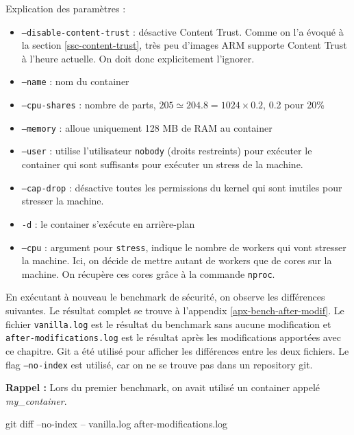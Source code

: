 \documentclass[11pt,a4paper,oneside]{report}
\newcommand{\code}[1]{\texttt{#1}}
\begin{document}
Explication des paramètres :
\begin{itemize}
\item \code{--disable-content-trust} : désactive Content Trust. Comme on l'a évoqué à la section \ref{ssc-content-trust}, très peu d'images ARM supporte Content Trust à l'heure actuelle. On doit donc explicitement l'ignorer.
\item \code{--name} : nom du container
\item \code{--cpu-shares} : nombre de parts, $205 \simeq 204.8 = 1024 \times 0.2$, 0.2 pour 20\%
\item \code{--memory} : alloue uniquement 128 MB de RAM au container
\item \code{--user} : utilise l'utilisateur \code{nobody} (droits restreints) pour exécuter le container qui sont suffisants pour exécuter un stress de la machine.
\item \code{--cap-drop} : désactive toutes les permissions du kernel qui sont inutiles pour stresser la machine.
\item \code{-d} : le container s'exécute en arrière-plan
\item \code{--cpu} : argument pour \code{stress}, indique le nombre de workers qui vont stresser la machine. Ici, on décide de mettre autant de workers que de cores sur la machine. On récupère ces cores grâce à la commande \code{nproc}.
\end{itemize}

En exécutant à nouveau le benchmark de sécurité, on observe les différences suivantes. Le résultat complet se trouve à l'appendix \ref{apx-bench-after-modif}. Le fichier \code{vanilla.log} est le résultat du benchmark sans aucune modification et \code{after-modifications.log} est le résultat après les modifications apportées avec ce chapitre. Git a été utilisé pour afficher les différences entre les deux fichiers. Le flag \code{--no-index} est utilisé, car on ne se trouve pas dans un repository git.

\textbf{Rappel :} Lors du premier benchmark, on avait utilisé un container appelé \textit{my\_container}.

\begin{bashcode}
git diff --no-index -- vanilla.log after-modifications.log
\end{bashcode}

\inputminted[xleftmargin=20pt, linenos=true, breaklines=true, frame=single, framesep=6pt, tabsize=2, fontfamily=courier, fontsize=\small]{diff}{../../docker_security_benchmark/diff.log}
\end{document}
